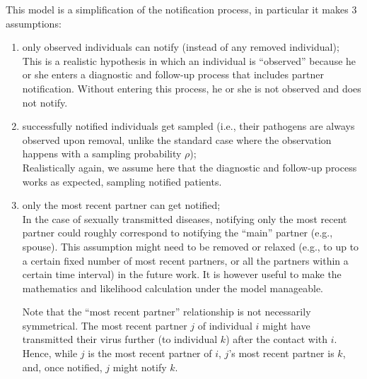 \documentclass[10pt,letterpaper]{article}
\begin{document}
This model is a simplification of the notification process, in particular it makes 3 assumptions:
\begin{enumerate}
\item only observed individuals can notify (instead of any removed individual);\\

This is a realistic hypothesis in which an individual is ``observed'' because he or she enters a diagnostic and follow-up process that includes partner notification. Without entering this process, he or she is not observed and does not notify.

\item successfully notified individuals get sampled (i.e., their pathogens are always observed upon removal, unlike the standard case where the observation happens with a sampling probability $\rho$);\\

Realistically again, we assume here that the diagnostic and follow-up process works as expected, sampling notified patients.

%

\item only the most recent partner can get notified;\\

In the case of sexually transmitted diseases, notifying only the most recent partner could roughly correspond to notifying the ``main'' partner (e.g., spouse). This assumption might need to be removed or relaxed (e.g., to up to a certain fixed number of most recent partners, or all the partners within a certain time interval) in the future work. It is however useful to make the mathematics and likelihood calculation under the model manageable. 

Note that the ``most recent partner'' relationship is not necessarily symmetrical. The most recent partner $j$ of individual $i$ might have transmitted their virus further (to individual $k$) after the contact with $i$. Hence, while $j$ is the most recent partner of $i$, $j$'s most recent partner is $k$, and, once notified, $j$ might notify $k$.  
\end{enumerate}
\end{document}
